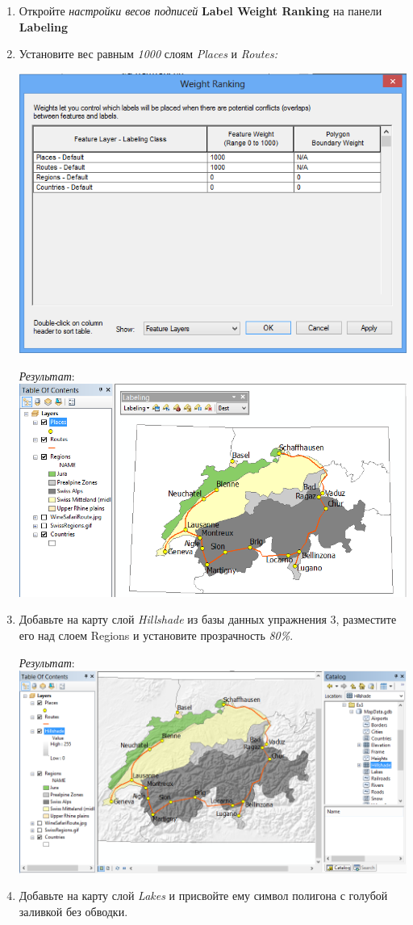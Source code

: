 \documentclass[12pt,]{book}
\begin{document}
\begin{enumerate}
\def\labelenumi{\arabic{enumi}.}
\item
  Откройте \emph{настройки весов подписей} \textbf{Label Weight Ranking} на панели \textbf{Labeling}
\item
  Установите вес равным \emph{1000} слоям \emph{Places} и \emph{Routes:}

  \includegraphics{images/Ex05/image33.png}

  \emph{Результат}:
  \includegraphics{images/Ex05/image34.png}
\item
  Добавьте на карту слой \emph{Hillshade} из базы данных упражнения 3, разместите его над слоем Regions и установите прозрачность \emph{80\%}.

  \emph{Результат}:
  \includegraphics{images/Ex05/image35.png}
\item
  Добавьте на карту слой \emph{Lakes} и присвойте ему символ полигона с голубой заливкой без обводки.


\end{enumerate}
\end{document}
